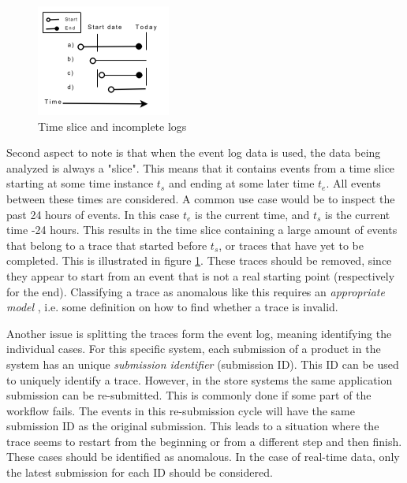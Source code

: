 \begin{figure}[htb]
\centering \includegraphics[width=0.5\linewidth]{gfx/figures/slice.png}
\caption{Time slice and incomplete logs }
\label{fig:timeslice}
\end{figure}

Second aspect to note is that when the event log data is used, the data being analyzed is always a "slice".
This means that it contains events from a time slice starting at some time instance $t_s$ and ending at some later time $t_e$. All events between these times are considered. A common use case would be to inspect the past 24 hours of events. In this case $t_e$ is the current time, and $t_s$ is the current time -24 hours. 
This results in the time slice containing a large amount of events that belong to a trace that started before $t_s$, or traces that have yet to be completed. This is illustrated in figure \ref{fig:timeslice}. These traces should be removed, since they appear to start from an event that is not a real starting point (respectively for the end). Classifying a trace as anomalous like this requires an \emph{appropriate model} \cite{bezerra2009anomaly}, 
i.e. some definition on how to find whether a trace is invalid.

Another issue is splitting the traces form the event log, meaning identifying the individual cases.
For this specific system, each submission of a product in the system has an unique \emph{submission identifier} (submission ID).
This ID can be used to uniquely identify a trace. 
However, in the store systems the same application submission can be re-submitted.
This is commonly done if some part of the workflow fails.
The events in this re-submission cycle will have the same submission ID as the original submission.
This leads to a situation where the trace seems to restart from the beginning or from a different step and then finish. These cases should be identified as anomalous. In the case of real-time data, only the latest submission for each ID should be considered.

